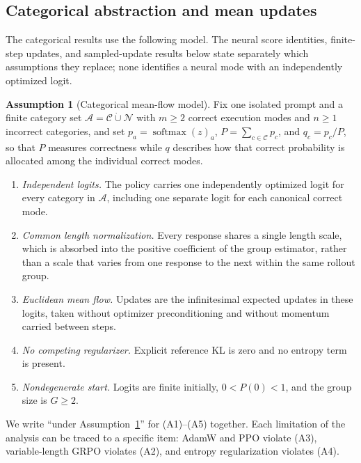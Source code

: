 \documentclass{article}
\newcommand{\1}{\mathbf 1}
\theoremstyle{remark}
\theoremstyle{definition}
\newtheorem{assumption}[lemma]{Assumption}
\theoremstyle{plain}
\begin{document}
\subsection{Categorical abstraction and mean updates}
\label{app:theory-grpo-mean}

The categorical results use the following model. The neural score identities,
finite-step updates, and sampled-update results below state separately which
assumptions they replace; none identifies a neural mode with an independently
optimized logit.

\begin{assumption}[Categorical mean-flow model]
\label{ass:categorical-mean-flow}
Fix one isolated prompt and a finite category set
$\mathcal A=\mathcal C\mathbin{\dot\cup}\mathcal N$ with $m\ge2$ correct
execution modes and $n\ge1$ incorrect categories, and set
$p_a=\operatorname{softmax}(z)_a$, $P=\sum_{c\in\mathcal C}p_c$, and
$q_c=p_c/P$, so that $P$ measures correctness while $q$ describes how that
correct probability is allocated among the individual correct modes.
\begin{enumerate}
\item[(A1)] \emph{Independent logits.} The policy carries one independently
  optimized logit for every category in $\mathcal A$, including one separate
  logit for each canonical correct mode.
\item[(A2)] \emph{Common length normalization.} Every response shares a single
  length scale, which is absorbed into the positive coefficient of the group
  estimator, rather than a scale that varies from one response to the next
  within the same rollout group.
\item[(A3)] \emph{Euclidean mean flow.} Updates are the infinitesimal expected
  updates in these logits, taken without optimizer preconditioning and without
  momentum carried between steps.
\item[(A4)] \emph{No competing regularizer.} Explicit reference KL is zero and
  no entropy term is present.
\item[(A5)] \emph{Nondegenerate start.} Logits are finite initially,
  $0<P(0)<1$, and the group size is $G\ge2$.
\end{enumerate}
\end{assumption}

We write ``under Assumption~\ref{ass:categorical-mean-flow}'' for (A1)--(A5)
together. Each limitation of the analysis can be traced to a specific item:
AdamW and PPO violate (A3), variable-length GRPO violates (A2), and entropy
regularization violates (A4).
\end{document}
